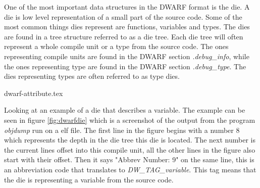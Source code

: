  


One of the most important data structures in the \gls{DWARF} format is the \gls{die}.
A \gls{die} is low level representation of a small part of the source code.
Some of the most common things \glspl{die} represent are functions, variables and types.
The \glspl{die} are found in a tree structure referred to as a \gls{die} tree.
Each \gls{die} tree will often represent a whole compile unit or a type from the source code.
The ones representing compile units are found in the \gls{DWARF} section \emph{.debug\_info}, while the ones representing type are found in the \gls{DWARF} section \emph{.debug\_type}.
The \glspl{die} representing types are often referred to as type \glspl{die}.




{dwarf-attribute.tex}


Looking at an example of a \gls{die} that describes a variable.
The example can be seen in figure \ref{fig:dwarfdie} which is a screenshot of the output from the program \emph{objdump} run on a \gls{elf} file.
The first line in the figure begins with a number $8$ which represents the depth in the \gls{die} tree this \gls{die} is located.
The next number is the current lines offset into this compile unit, all the other lines in the figure also start with their offset.
Then it says "Abbrev Number: 9" on the same line, this is an abbreviation code that translates to \emph{DW\_TAG\_variable}.
This tag means that the \gls{die} is representing a variable from the source code.


